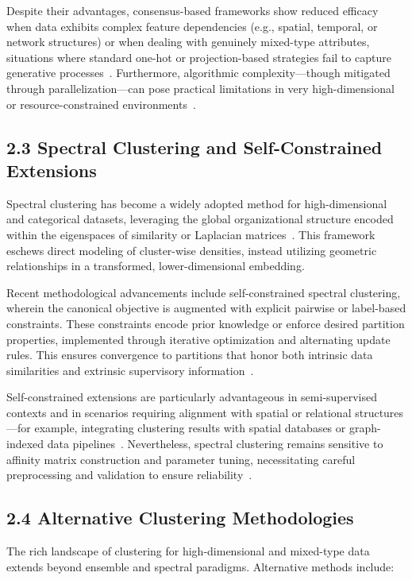 \documentclass[11pt]{article}
\begin{document}
Despite their advantages, consensus-based frameworks show reduced efficacy when data exhibits complex feature dependencies (e.g., spatial, temporal, or network structures) or when dealing with genuinely mixed-type attributes, situations where standard one-hot or projection-based strategies fail to capture generative processes~\cite{ref116}. Furthermore, algorithmic complexity—though mitigated through parallelization—can pose practical limitations in very high-dimensional or resource-constrained environments~\cite{ref116}.

\subsection{2.3 Spectral Clustering and Self-Constrained Extensions}

Spectral clustering has become a widely adopted method for high-dimensional and categorical datasets, leveraging the global organizational structure encoded within the eigenspaces of similarity or Laplacian matrices~\cite{ref36, ref117}. This framework eschews direct modeling of cluster-wise densities, instead utilizing geometric relationships in a transformed, lower-dimensional embedding.

Recent methodological advancements include self-constrained spectral clustering, wherein the canonical objective is augmented with explicit pairwise or label-based constraints. These constraints encode prior knowledge or enforce desired partition properties, implemented through iterative optimization and alternating update rules. This ensures convergence to partitions that honor both intrinsic data similarities and extrinsic supervisory information~\cite{ref117}.

Self-constrained extensions are particularly advantageous in semi-supervised contexts and in scenarios requiring alignment with spatial or relational structures—for example, integrating clustering results with spatial databases or graph-indexed data pipelines~\cite{ref117}. Nevertheless, spectral clustering remains sensitive to affinity matrix construction and parameter tuning, necessitating careful preprocessing and validation to ensure reliability~\cite{ref36, ref117}.

\subsection{2.4 Alternative Clustering Methodologies}

The rich landscape of clustering for high-dimensional and mixed-type data extends beyond ensemble and spectral paradigms. Alternative methods include:
\end{document}
